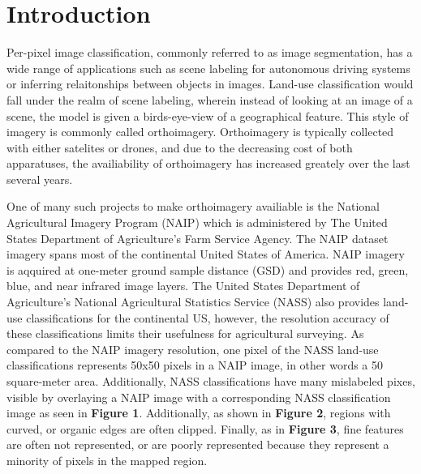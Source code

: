 \documentclass[12pt]{article}
\begin{document}
\newpage

\section{Introduction}

Per-pixel image classification, commonly referred to as image segmentation, has a wide range of applications such as scene labeling for autonomous driving systems or inferring relaitonships between objects in images. Land-use classification would fall under the realm of scene labeling, wherein instead of looking at an image of a scene, the model is given a birds-eye-view of a geographical feature. This style of imagery is commonly called orthoimagery. Orthoimagery is typically collected with either satelites or drones, and due to the decreasing cost of both apparatuses, the availiability of orthoimagery has increased greately over the last several years. 

One of many such projects to make orthoimagery availiable is the National Agricultural Imagery Program (NAIP) which is administered by The United States Department of Agriculture's Farm Service Agency. The NAIP dataset imagery spans most of the continental United States of America. NAIP imagery is aqquired at one-meter ground sample distance (GSD) and provides red, green, blue, and near infrared image layers. The United States Department of Agriculture's National Agricultural Statistics Service (NASS) also provides land-use classifications for the continental US, however, the resolution accuracy of these classifications limits their usefulness for agricultural surveying. As compared to the NAIP imagery resolution, one pixel of the NASS land-use classifications represents 50x50 pixels in a NAIP image, in other words a 50 square-meter area. Additionally, NASS classifications have many mislabeled pixes, visible by overlaying a NAIP image with a corresponding NASS classification image as seen in \textbf{Figure 1}. Additionally, as shown in \textbf{Figure 2}, regions with curved, or organic edges are often clipped. Finally, as in \textbf{Figure 3}, fine features are often not represented, or are poorly represented because they represent a minority of pixels in the mapped region.
\end{document}
